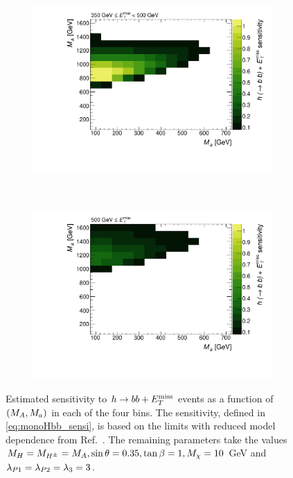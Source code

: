 \begin{figure}[tbp]
\begin{subfigure}{0.48\textwidth}
\includegraphics[width = \textwidth]{texinputs/04_grid/figures/monoHbb_sensi_bin_3_ma_vs_mA_lin.pdf}
\end{subfigure}
~
\begin{subfigure}{0.48\textwidth}
\includegraphics[width = \textwidth]{texinputs/04_grid/figures/monoHbb_sensi_bin_4_ma_vs_mA_lin.pdf}
\end{subfigure}
\caption[Sensitivity to the $h\to bb + \MET$ signal by $\MET$ bin, $\mA$ - $\ma$ plane]
{Estimated sensitivity to $h\to bb + \MET$ events as a function of $(M_{A},M_{a})$ in each of  the four \met bins. 
The sensitivity, defined in \autoref{eq:monoHbb_sensi}, is based on the limits with reduced model dependence from Ref.~\cite{Aaboud:2017yqz}. 
The remaining parameters take the values
$ M_{H}=M_{H^{\pm}}= M_{A}, \sin\theta = 0.35, \tan\beta = 1, M_{\chi} = 10$ GeV and $ \lambda_{P1} = \lambda_{P2} = \lambda_{3} = 3 $.}
\label{fig:monoHbb_sensi_bins_mA_ma}
\end{figure}

